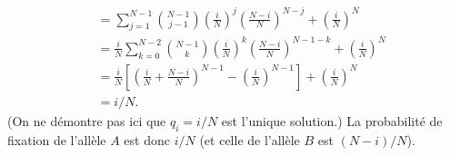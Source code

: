 {\begin{description}
\begin{align*}
      & = \sum_{j=1}^{N-1} \binom{N-1}{j-1} \left(\frac{i}N\right)^j \left(\frac{N-i} N\right)^{N-j} + \left(\frac{i}N\right)^N \\
      & = \frac{i}N \sum_{k=0}^{N-2} \binom{N-1}{k} \left(\frac{i}N\right)^k \left(\frac{N-i} N\right)^{N-1-k} + \left(\frac{i}N\right)^N \\
      & = \frac{i}N \left[\left(\frac{i}N + \frac{N-i}N\right)^{N-1} - \left(\frac{i}N\right)^{N-1}\right] + \left(\frac{i}N\right)^N \\
      & = i/N.
    \end{align*}
    (On ne démontre pas ici que $q_i = i/N$ est l'unique solution.) La probabilité de fixation de l'allèle $A$ est donc $i/N$ (et celle de l'allèle $B$ est $(N-i)/N$).
  \end{description}
  
}

